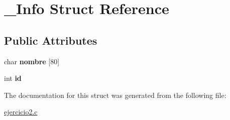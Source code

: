 \hypertarget{struct___info}{}\section{\+\_\+\+Info Struct Reference}
\label{struct___info}
\subsection*{Public Attributes}
\begin{DoxyCompactItemize}
\item 
\mbox{\label{struct___info_a89fea0009f6ad70c30ca21e681171093}} 
char {\bfseries nombre} \mbox{[}80\mbox{]}
\item 
\mbox{\label{struct___info_a6edb2741a028f19307e29d2c9c2aa2bf}} 
int {\bfseries id}
\end{DoxyCompactItemize}


The documentation for this struct was generated from the following file\+:\begin{DoxyCompactItemize}
\item 
\hyperlink{ejercicio2_8c}{ejercicio2.\+c}\end{DoxyCompactItemize}
